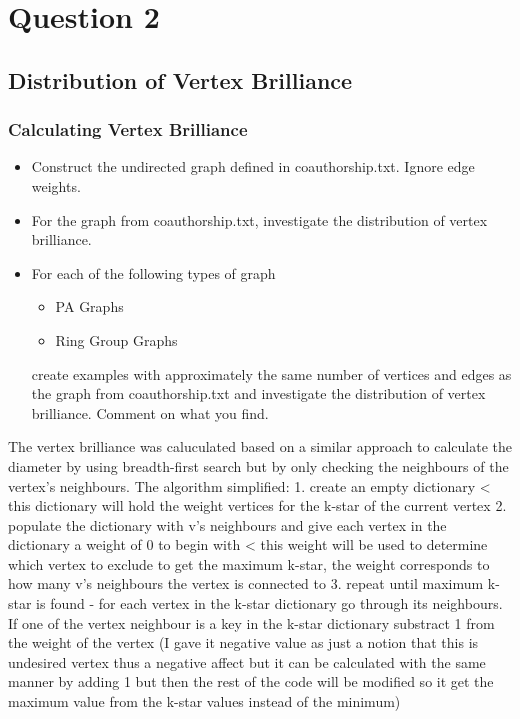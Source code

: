 \documentclass[11pt,a4paper,notitlepage]{article}
\begin{document}
\section*{Question 2}
\subsection*{Distribution of Vertex Brilliance}
\subsubsection*{Calculating Vertex Brilliance}
\begin{itemize}
    \item Construct the undirected graph defined in coauthorship.txt. Ignore edge weights.
    \item For the graph from coauthorship.txt, investigate the distribution of vertex brilliance. 
    \item For each of the following types of graph
    \begin{itemize}
    \item PA Graphs
    \item Ring Group Graphs 
    \end{itemize}
    create examples with approximately the same number of vertices and edges as the graph from coauthorship.txt and investigate the distribution of vertex brilliance. Comment on what you find.
\end{itemize}
The vertex brilliance was caluculated based on a similar approach to calculate the diameter by using breadth-first search but by only checking the neighbours of the vertex's neighbours. The algorithm simplified:
     1. create an empty dictionary < this dictionary will hold the weight vertices for the k-star of the current vertex 
     2. populate the dictionary with v's neighbours and give each vertex in the dictionary a weight of 0 to begin with < this weight will be used to determine which vertex to exclude to get the maximum k-star, the weight corresponds to how many v's neighbours the vertex is connected to
     3. repeat until maximum k-star is found
            - for each vertex in the k-star dictionary go through its neighbours. If one of the vertex neighbour is a key in the k-star dictionary substract 1 from the weight of the vertex (I gave it negative value as just a notion that this is undesired vertex thus a negative affect but it can be calculated with the same manner by adding 1 but then the rest of the code will be modified so it get the maximum value from the k-star values instead of the minimum)
\end{document}
